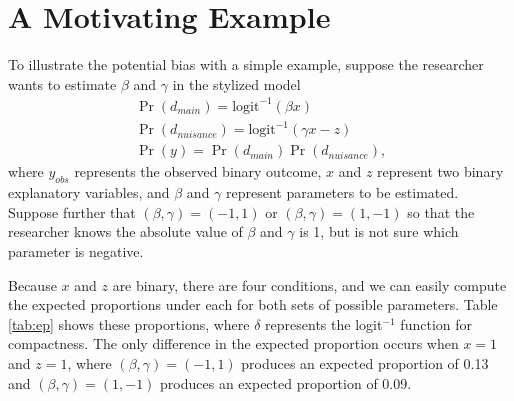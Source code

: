 \documentclass[10pt]{article}
\begin{document}
\section*{A Motivating Example}

To illustrate the potential bias with a simple example, suppose the researcher wants to estimate $\beta$ and $\gamma$ in the stylized model
\begin{gather*}
\Pr(d_{main}) = \text{logit}^{-1}(\beta x)\nonumber\\
\Pr(d_{nuisance}) = \text{logit}^{-1}(\gamma x - z)\nonumber\\
\Pr(y) = \Pr(d_{main})\Pr(d_{nuisance})\text{,}\nonumber
\end{gather*}
where $y_{obs}$ represents the observed binary outcome, $x$ and $z$ represent two binary explanatory variables, and $\beta$ and $\gamma$ represent parameters to be estimated. 
Suppose further that $(\beta, \gamma) = (-1, 1)$ or $(\beta, \gamma) = (1, -1)$ so that the researcher knows the absolute value of $\beta$ and $\gamma$ is 1, but is not sure which parameter is negative.

Because $x$ and $z$ are binary, there are four conditions, and we can easily compute the expected proportions under each for both sets of possible parameters. 
Table \ref{tab:ep} shows these proportions, where $\delta$ represents the logit$^{-1}$ function for compactness. 
The only difference in the expected proportion occurs when $x = 1$ and $z = 1$, where $(\beta, \gamma) = (-1, 1)$ produces an expected proportion of 0.13 and $(\beta, \gamma) = (1, -1)$ produces an expected proportion of 0.09.
\end{document}
